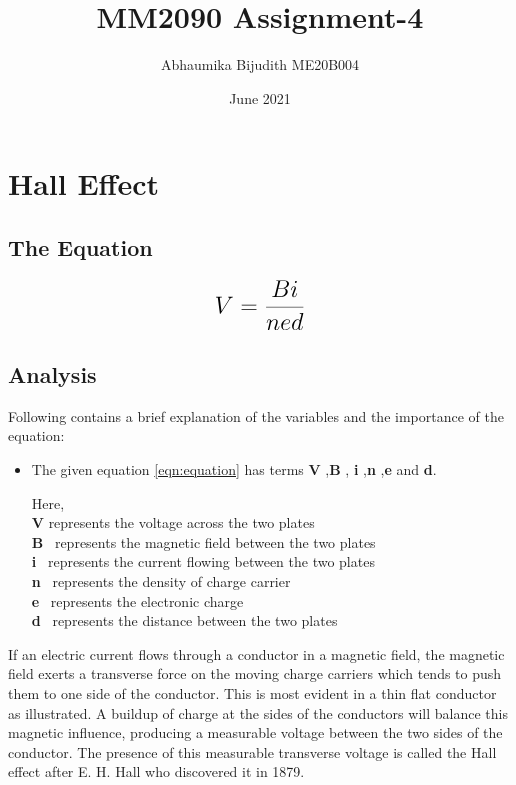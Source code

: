 \documentclass[a4paper, 12pt]{article}
\begin{document}
\title{MM2090 Assignment-4}
\author{Abhaumika Bijudith ME20B004}
\date{June 2021}
\maketitle
\section{Hall Effect}
\subsection{The Equation}

\begin{equation}
 {\LARGE{\textbf{$V =\frac{Bi}{{ned}}$}}}
 \label{eqn:equation}
\end{equation}


\subsection{Analysis}
Following contains a brief explanation of the variables and the importance of the equation:
\begin{itemize}
\item {\normalsize {The given equation \ref{eqn:equation} has terms \textbf{V} ,\textbf{B} , \textbf{i} ,\textbf{n} ,\textbf{e} and  \textbf{d}.}}

{ Here,}\\
{\textbf{V} represents the voltage across the two plates }\\
{\textbf{B} \  represents the magnetic field between the two plates}\\
{\textbf{i} \  represents the current flowing between the two plates}\\
{\textbf{n} \  represents the density of charge carrier}\\
{\textbf{e} \ represents the electronic charge}\\
{\textbf{d} \ represents the distance between the two plates}
\end{itemize}

If an electric current flows through a conductor in a magnetic field, the magnetic field exerts a transverse force on the moving charge carriers which tends to push them to one side of the conductor. This is most evident in a thin flat conductor as illustrated. A buildup of charge at the sides of the conductors will balance this magnetic influence, producing a measurable voltage between the two sides of the conductor. The presence of this measurable transverse voltage is called the Hall effect after E. H. Hall who discovered it in 1879. \cite{weblink1}
\end{document}

